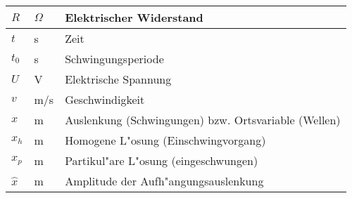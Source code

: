 \begin{MSectionStart}
\begin{tabular}{|l|l|l|}
  $R$    & $\Omega$ & Elektrischer Widerstand \\\hline
  $t$    & s       & Zeit \\\hline
  $t_0$  & s       & Schwingungsperiode \\\hline
  $U$    & V       & Elektrische Spannung \\\hline
  $v$    & m/s     & Geschwindigkeit \\\hline
  $x$    & m       & Auslenkung (Schwingungen) bzw. Ortsvariable (Wellen) \\\hline
  $x_h$  & m       & Homogene L"osung (Einschwingvorgang) \\\hline
  $x_p$  & m       & Partikul"are L"osung (eingeschwungen) \\\hline
  $\hat{x}$ & m    & Amplitude der Aufh"angungsauslenkung \\\hline
\end{tabular}


\end{MSectionStart}
